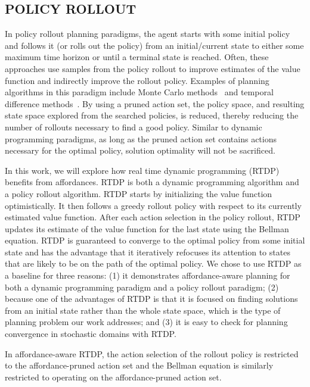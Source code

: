\documentclass[]{article}
\begin{document}
\subsection{POLICY ROLLOUT}

In policy rollout planning paradigms, the agent starts with some
initial policy and follows it (or rolls out the policy) from an
initial/current state to either some maximum time horizon or until a
terminal state is reached. Often, these approaches use samples from
the policy rollout to improve estimates of the value function and
indirectly improve the rollout policy. Examples of planning algorithms
in this paradigm include Monte Carlo methods~\citep{browne12,
  silver10} and temporal difference
methods~\citep{sutton99,sutton1988lpm,rummery1994line,6313077,lagoudakis2003least,Peters:2008ve}.
By using a pruned
action set, the policy space, and resulting state space explored from
the searched policies, is reduced, thereby reducing the number of
rollouts necessary to find a good policy. Similar to dynamic
programming paradigms, as long as the pruned action set contains
actions necessary for the optimal policy, solution optimality will not
be sacrificed.

In this work, we will explore how real time dynamic programming
(RTDP)~\citep{barto95} benefits from affordances. RTDP is both a
dynamic programming algorithm and a policy rollout algorithm. RTDP
starts by initializing the value function optimistically. It then
follows a greedy rollout policy with respect to its currently
estimated value function. After each action selection in the policy
rollout, RTDP updates its estimate of the value function for the last
state using the Bellman equation. RTDP is guaranteed to converge to
the optimal policy from some initial state and has the advantage that
it iteratively refocuses its attention to states that are likely to be
on the path of the optimal policy. We chose to use RTDP as a baseline
for three reasons: (1) it demonstrates affordance-aware planning for
both a dynamic programming paradigm and a policy rollout paradigm;
(2) because one of the advantages of RTDP is that it is focused
on finding solutions from an initial state rather than the whole
state space, which is the type of planning problem our work addresses;
and (3) it is easy to check for planning convergence in stochastic domains
with RTDP.

In affordance-aware RTDP, the action selection of the rollout policy
is restricted to the affordance-pruned action set and the Bellman
equation is similarly restricted to operating on the affordance-pruned
action set.
\end{document}
